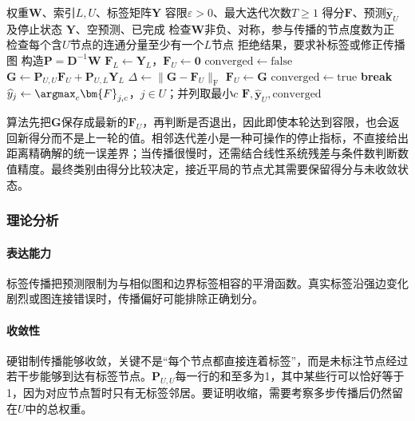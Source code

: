 \begin{algorithm}[硬钳制标签传播]
  \label{alg:classification-label-propagation}
  \begin{algorithmic}[1]
    \Require 权重$\bm{W}$、索引$L,U$、标签矩阵$\bm{Y}$
    \Require 容限$\varepsilon>0$、最大迭代次数$T\geq1$
    \Ensure 得分$\bm{F}$、预测$\widehat{\bm{y}}_U$及停止状态
      \State \Return $\bm{Y}$、空预测、已完成
    \EndIf
    \State 检查$\bm{W}$非负、对称，参与传播的节点度数为正
    \State 检查每个含$U$节点的连通分量至少有一个$L$节点
      \State \Return 拒绝结果，要求补标签或修正传播图
    \EndIf
    \State 构造$\bm{P}=\bm{D}^{-1}\bm{W}$
    \State $\bm{F}_L\gets\bm{Y}_L$，$\bm{F}_U\gets\bm{0}$
    \State $\mathrm{converged}\gets\mathrm{false}$
      \State $\bm{G}\gets\bm{P}_{U,U}\bm{F}_U+\bm{P}_{U,L}\bm{Y}_L$
      \State $\Delta\gets\lVert\bm{G}-\bm{F}_U\rVert_{\mathrm{F}}$
      \State $\bm{F}_U\gets\bm{G}$
        \State $\mathrm{converged}\gets\mathrm{true}$
        \State \textbf{break}
      \EndIf
    \EndFor
    \State $\widehat y_j\gets\argmax_c\bm{F}_{j,c}$，$j\in U$；并列取最小$c$
    \State \Return $\bm{F},\widehat{\bm{y}}_U,\mathrm{converged}$
  \end{algorithmic}
\end{algorithm}

算法先把$\bm{G}$保存成最新的$\bm{F}_U$，再判断是否退出，因此即使本轮达到容限，也会返回新得分而不是上一轮的值。相邻迭代差小是一种可操作的停止指标，不直接给出距离精确解的统一误差界；当传播很慢时，还需结合线性系统残差与条件数判断数值精度。最终类别由得分比较决定，接近平局的节点尤其需要保留得分与未收敛状态。

\subsubsection{理论分析}
\label{sec:classification-label-propagation-analysis}

\paragraph{表达能力}
标签传播把预测限制为与相似图和边界标签相容的平滑函数。真实标签沿强边变化剧烈或图连接错误时，传播偏好可能排除正确划分。

\paragraph{收敛性}
硬钳制传播能够收敛，关键不是“每个节点都直接连着标签”，而是未标注节点经过若干步能够到达有标签节点。$\bm{P}_{U,U}$每一行的和至多为1，其中某些行可以恰好等于1，因为对应节点暂时只有无标签邻居。要证明收缩，需要考察多步传播后仍然留在$U$中的总权重。

